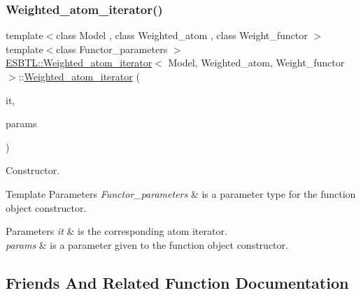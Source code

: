 \subsubsection{\texorpdfstring{Weighted\+\_\+atom\+\_\+iterator()}{Weighted\_atom\_iterator()}}
{\footnotesize\ttfamily template$<$class Model , class Weighted\+\_\+atom , class Weight\+\_\+functor $>$ \\
template$<$class Functor\+\_\+parameters $>$ \\
\hyperlink{classESBTL_1_1Weighted__atom__iterator}{E\+S\+B\+T\+L\+::\+Weighted\+\_\+atom\+\_\+iterator}$<$ Model, Weighted\+\_\+atom, Weight\+\_\+functor $>$\+::\hyperlink{classESBTL_1_1Weighted__atom__iterator}{Weighted\+\_\+atom\+\_\+iterator} (\begin{DoxyParamCaption}\item[{typename Model\+::\+Atoms\+\_\+const\+\_\+iterator}]{it,  }\item[{Functor\+\_\+parameters}]{params }\end{DoxyParamCaption})\hspace{0.3cm}{\ttfamily [inline]}}

Constructor. 
\begin{DoxyTemplParams}{Template Parameters}
{\em Functor\+\_\+parameters} & is a parameter type for the function object constructor. \\
\hline
\end{DoxyTemplParams}

\begin{DoxyParams}{Parameters}
{\em it} & is the corresponding atom iterator. \\
\hline
{\em params} & is a parameter given to the function object constructor. \\
\hline
\end{DoxyParams}


\subsection{Friends And Related Function Documentation}
\mbox{\label{classESBTL_1_1Weighted__atom__iterator_ac09f73e325921cc50ebcd96bed0f8096}} 
